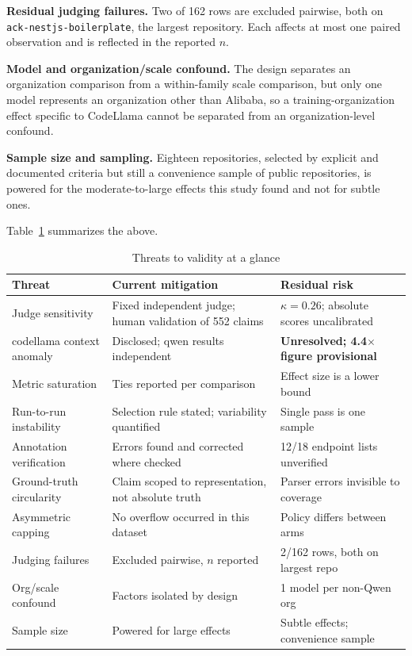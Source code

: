 \documentclass[conference]{IEEEtran}
\begin{document}
\textbf{Residual judging failures.} Two of 162 rows are excluded pairwise, both on
\texttt{ack-nestjs-boilerplate}, the largest repository. Each affects at most one paired
observation and is reflected in the reported $n$.

\textbf{Model and organization/scale confound.} The design separates an organization comparison
from a within-family scale comparison, but only one model represents an organization other than
Alibaba, so a training-organization effect specific to CodeLlama cannot be separated from an
organization-level confound.

\textbf{Sample size and sampling.} Eighteen repositories, selected by explicit and documented
criteria but still a convenience sample of public repositories, is powered for the
moderate-to-large effects this study found and not for subtle ones.

Table~\ref{tab:threats} summarizes the above.

\begin{table}[htbp]
\caption{Threats to validity at a glance}
\label{tab:threats}
\centering
\footnotesize
\begin{tabular}{@{}p{1.55cm}p{2.7cm}p{2.0cm}@{}}
\toprule
Threat & Current mitigation & Residual risk \\
\midrule
Judge sensitivity & Fixed independent judge; human validation of 552 claims & $\kappa=0.26$; absolute scores uncalibrated \\
codellama context anomaly & Disclosed; qwen results independent & \textbf{Unresolved; 4.4$\times$ figure provisional} \\
Metric saturation & Ties reported per comparison & Effect size is a lower bound \\
Run-to-run instability & Selection rule stated; variability quantified & Single pass is one sample \\
Annotation verification & Errors found and corrected where checked & 12/18 endpoint lists unverified \\
Ground-truth circularity & Claim scoped to representation, not absolute truth & Parser errors invisible to coverage \\
Asymmetric capping & No overflow occurred in this dataset & Policy differs between arms \\
Judging failures & Excluded pairwise, $n$ reported & 2/162 rows, both on largest repo \\
Org/scale confound & Factors isolated by design & 1 model per non-Qwen org \\
Sample size & Powered for large effects & Subtle effects; convenience sample \\
\bottomrule
\end{tabular}
\end{table}
\end{document}
